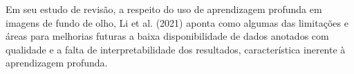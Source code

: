 \documentclass[12pt]{article}
\begin{document}
Em seu estudo de revisão, a respeito do uso de aprendizagem profunda em imagens de fundo de olho, Li et al. (2021) \cite{li_review_2021} aponta como algumas das limitações e áreas para melhorias futuras a baixa disponibilidade de dados anotados com qualidade e a falta de interpretabilidade dos resultados, característica inerente à aprendizagem profunda.

\end{document}
